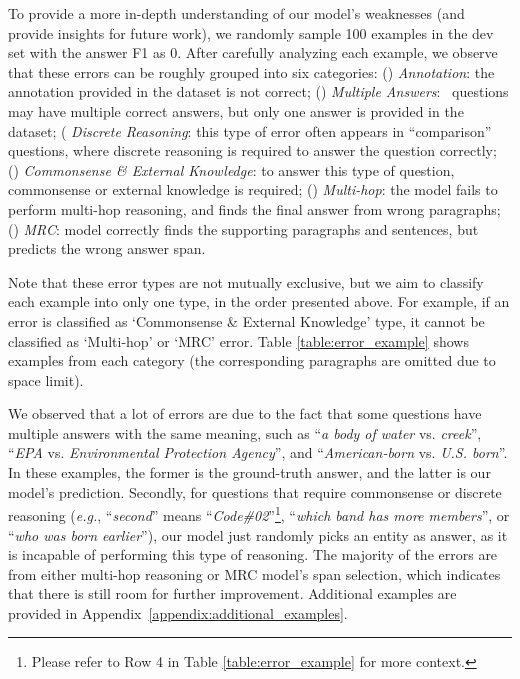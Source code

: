\documentclass[11pt,a4paper]{article}
\begin{document}
To provide a more in-depth understanding of our model's weaknesses (and provide insights for future work), we randomly sample 100 examples in the dev set with the answer F1 as 0. After carefully analyzing each example, we observe that these errors can be roughly grouped into six categories:
() \emph{Annotation}: the annotation provided in the dataset is not correct; () \emph{Multiple Answers}: \,
questions may have multiple correct answers, but only one answer is provided in the dataset; ( \emph{Discrete Reasoning}: this type of error often appears in ``comparison'' questions, where discrete reasoning is required to answer the question correctly; () \emph{Commonsense \& External Knowledge}: to answer this type of question, commonsense or external knowledge is required; () \emph{Multi-hop}: the model fails to perform multi-hop reasoning, and finds the final answer from wrong paragraphs; () \emph{MRC}: model correctly finds the supporting paragraphs and sentences, but predicts the wrong answer span.

Note that these error types are not mutually exclusive, but we aim to classify each example into only one type, in the order presented above. For example, if an error is classified as `Commonsense \& External Knowledge' type, it cannot be classified as `Multi-hop' or `MRC' error. 
Table \ref{table:error_example} shows examples from each category (the corresponding paragraphs are omitted due to space limit).  

We observed that a lot of errors are due to the fact that some questions have multiple answers with the same meaning, such as ``\textit{a body of water} vs. \textit{creek}'', ``\textit{EPA} vs. \textit{Environmental Protection Agency}'', and ``\textit{American-born} vs. \textit{U.S. born}''. In these examples, the former is the ground-truth answer, and the latter is our model's prediction. Secondly, for questions that require commonsense or discrete reasoning (\emph{e.g.}, ``\textit{second}'' means ``\textit{Code\#02}''\footnote{Please refer to Row 4 in Table \ref{table:error_example} for more context.}, ``\textit{which band has more members}'', or ``\textit{who was born earlier}''), our model just randomly picks an entity as answer, as it is incapable of performing this type of reasoning. The majority of the errors are from either multi-hop reasoning or MRC model's span selection, which indicates that there is still room for further improvement. Additional examples are provided in Appendix~\ref{appendix:additional_examples}.
\end{document}
